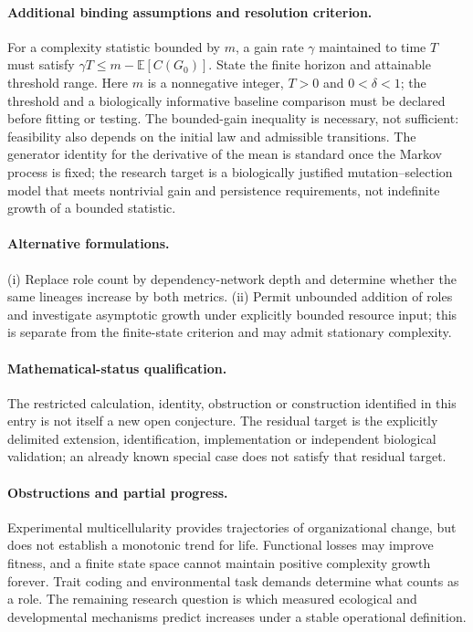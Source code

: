 \documentclass[11pt]{article}
\begin{document}
\paragraph{Additional binding assumptions and resolution criterion.} For a complexity statistic bounded by $m$, a gain rate $\gamma$ maintained to time $T$ must satisfy $\gamma T\leq m-\mathbb{E}[C(G_0)]$. State the finite horizon and attainable threshold range. Here $m$ is a nonnegative integer, $T>0$ and $0<\delta<1$; the threshold and a biologically informative baseline comparison must be declared before fitting or testing. The bounded-gain inequality is necessary, not sufficient: feasibility also depends on the initial law and admissible transitions. The generator identity for the derivative of the mean is standard once the Markov process is fixed; the research target is a biologically justified mutation--selection model that meets nontrivial gain and persistence requirements, not indefinite growth of a bounded statistic.

\paragraph{Alternative formulations.} (i) Replace role count by dependency-network depth and determine whether the same lineages increase by both metrics. (ii) Permit unbounded addition of roles and investigate asymptotic growth under explicitly bounded resource input; this is separate from the finite-state criterion and may admit stationary complexity.
\paragraph{Mathematical-status qualification.} The restricted calculation, identity, obstruction or construction identified in this entry is not itself a new open conjecture. The residual target is the explicitly delimited extension, identification, implementation or independent biological validation; an already known special case does not satisfy that residual target.

\paragraph{Obstructions and partial progress.} Experimental multicellularity provides trajectories of organizational change, but does not establish a monotonic trend for life. Functional losses may improve fitness, and a finite state space cannot maintain positive complexity growth forever. Trait coding and environmental task demands determine what counts as a role. The remaining research question is which measured ecological and developmental mechanisms predict increases under a stable operational definition.
\end{document}
